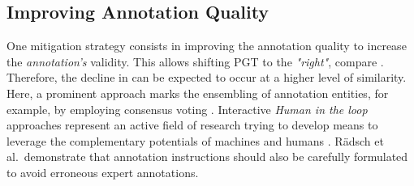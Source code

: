 \subsection{Improving Annotation Quality}
One mitigation strategy consists in improving the annotation quality to increase the \emph{annotation's} validity.
This allows shifting \ac{PGT} to the \emph{"right"}, compare .
Therefore, the decline in  can be expected to occur at a higher level of similarity.
Here, a prominent approach marks the ensembling of annotation entities, for example, by employing consensus voting \citep{klebanov2010some,MaierHein2016, qing-etal-2014-empirical,yang2022neural}.
Interactive \emph{Human in the loop} approaches represent an active field of research trying to develop means to leverage the complementary potentials of machines and humans  \citep{Mosqueira-Rey2022,BUDD2021102062}.
Rädsch et al.\ demonstrate that annotation instructions should also be carefully formulated \citep{radsch2022labeling} to avoid erroneous expert annotations.
